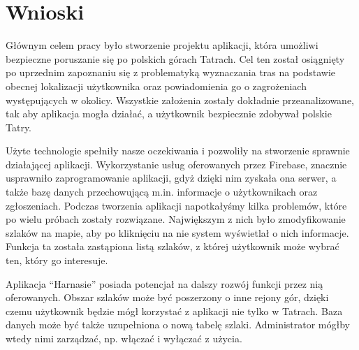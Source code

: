 \section{Wnioski} \label{wnioski}
Głównym celem pracy było stworzenie projektu aplikacji, która umożliwi bezpieczne poruszanie się po polskich górach Tatrach. Cel ten został osiągnięty po uprzednim zapoznaniu się z problematyką wyznaczania tras na podstawie obecnej lokalizacji użytkownika oraz powiadomienia go o zagrożeniach występujących w okolicy. Wszystkie założenia zostały dokładnie przeanalizowane, tak aby aplikacja mogła działać, a użytkownik bezpiecznie zdobywał polskie Tatry.

Użyte technologie spełniły nasze oczekiwania i pozwoliły na stworzenie sprawnie działającej aplikacji. Wykorzystanie usług oferowanych przez Firebase, znacznie usprawniło zaprogramowanie aplikacji, gdyż dzięki nim zyskała ona serwer, a także bazę danych przechowującą m.in. informacje o użytkownikach oraz zgłoszeniach. Podczas tworzenia aplikacji napotkałyśmy kilka problemów, które po wielu próbach zostały rozwiązane.
Największym z nich było zmodyfikowanie szlaków na mapie, aby po kliknięciu na nie system wyświetlał o nich informacje. Funkcja ta została zastąpiona listą szlaków, z której użytkownik może wybrać ten, który go interesuje.

Aplikacja “Harnasie” posiada potencjał na dalszy rozwój funkcji przez nią oferowanych. Obszar szlaków może być poszerzony o inne rejony gór, dzięki czemu użytkownik będzie mógł korzystać z aplikacji nie tylko w Tatrach. Baza danych może być także uzupełniona o nową tabelę szlaki. Administrator mógłby wtedy nimi zarządzać, np. włączać i wyłączać z użycia.

